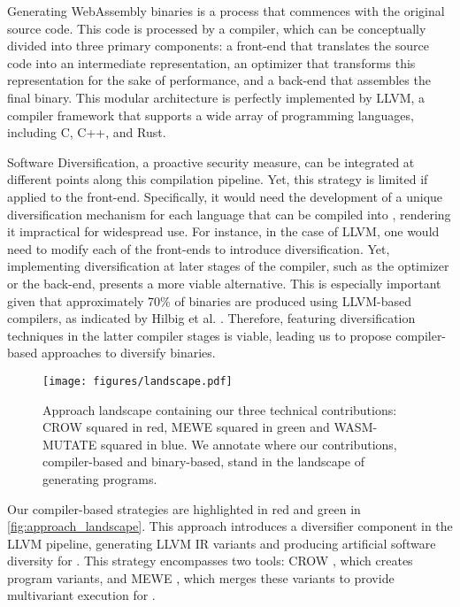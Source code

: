 

Generating  WebAssembly binaries is a process that commences with the original source code.
This code is processed by a compiler, which can be conceptually divided into three primary components: a front-end that translates the source code into an intermediate representation, an optimizer that transforms this representation for the sake of performance, and a back-end that assembles the final \Wasm binary. 
This modular architecture is perfectly implemented by LLVM, a compiler framework that supports a wide array of programming languages, including C, C++, and Rust. 

Software Diversification, a proactive security measure, can be integrated at different points along this compilation pipeline. 
Yet, this strategy is limited if applied to the front-end. 
Specifically, it would need the development of a unique diversification mechanism for each language that can be compiled into \Wasm, rendering it impractical for widespread use. 
For instance, in the case of LLVM, one would need to modify each of the front-ends to introduce diversification. 
Yet, implementing diversification at later stages of the compiler, such as the optimizer or the back-end, presents a more viable alternative. 
This is especially important given that approximately 70\% of \Wasm binaries are produced using LLVM-based compilers, as indicated by Hilbig et al. \cite{Hilbig2021AnES}.
Therefore, featuring diversification techniques in the latter compiler stages is viable, leading us to propose compiler-based approaches to diversify \Wasm binaries. 


\begin{figure}[h]
	\centering
	\texttt{[image: figures/landscape.pdf]}
	\caption{Approach landscape containing our three technical contributions: CROW squared in red, MEWE squared in green and WASM-MUTATE squared in blue. We annotate where our contributions, compiler-based and binary-based, stand in the landscape of generating \Wasm programs.}
	\label{fig:approach_landscape}
\end{figure}

Our compiler-based strategies are highlighted in red and green in \autoref{fig:approach_landscape}. 
This approach introduces a diversifier component in the LLVM pipeline, generating LLVM IR variants and producing artificial software diversity for \wasm. 
This strategy encompasses two tools: CROW \cite{CROW}, which creates \wasm program variants, and MEWE \cite{MEWE}, which merges these variants to provide multivariant execution \cite{cox06} for \wasm.


